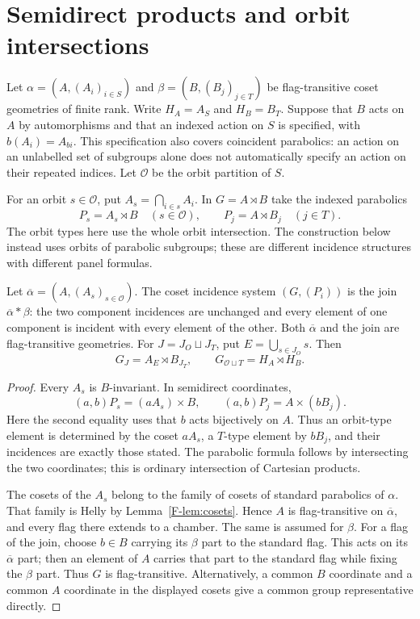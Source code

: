 \section{Semidirect products and orbit intersections}\label{sec:semidirect}

Let $\alpha=(A,(A_i)_{i\in S})$ and
$\beta=(B,(B_j)_{j\in T})$ be flag-transitive coset geometries of
finite rank. Write $H_A=A_S$ and $H_B=B_T$. Suppose that $B$ acts on
$A$ by automorphisms and that an indexed action on $S$ is specified,
with $b(A_i)=A_{bi}$. This specification also covers coincident
parabolics: an action on an unlabelled set of subgroups alone does not
automatically specify an action on their repeated indices. Let
$\mathcal O$ be the orbit partition of $S$.

For an orbit $s\in\mathcal O$, put $A_s=\bigcap_{i\in s}A_i$.
In $G=A\rtimes B$ take the indexed parabolics
\[
 P_s=A_s\rtimes B\quad(s\in\mathcal O),\qquad
 P_j=A\rtimes B_j\quad(j\in T).
\]
The orbit types here use the whole orbit intersection. The construction below instead uses orbits of parabolic subgroups; these are different incidence structures with different panel formulas.

\begin{proposition}\label{J-prop:join}
Let $\overline\alpha=(A,(A_s)_{s\in\mathcal O})$. The coset
incidence system $(G,(P_i))$ is the join
$\overline\alpha*\beta$: the two component incidences are unchanged
and every element of one component is incident with every element of
the other. Both $\overline\alpha$ and the join are flag-transitive
geometries. For $J=J_O\sqcup J_T$, put
$E=\bigcup_{s\in J_O}s$. Then
\[
 G_J=A_E\rtimes B_{J_T},\qquad G_{\mathcal O\sqcup T}=H_A\rtimes H_B.
\]
\end{proposition}
\begin{proof}
Every $A_s$ is $B$-invariant. In semidirect coordinates,
\[
 (a,b)P_s=(aA_s)\times B,\qquad
 (a,b)P_j=A\times(bB_j).
\]
Here the second equality uses that $b$ acts bijectively on $A$.
Thus an orbit-type element is determined by the coset $aA_s$, a
$T$-type element by $bB_j$, and their incidences are exactly those
stated. The parabolic formula follows by intersecting the two
coordinates; this is ordinary intersection of Cartesian products.

The cosets of the $A_s$ belong to the family of cosets of standard
parabolics of $\alpha$. That family is Helly by Lemma~\ref{F-lem:cosets}. Hence $A$ is flag-transitive on $\overline\alpha$, and every
flag there extends to a chamber. The same is assumed for $\beta$.
For a flag of the join, choose $b\in B$ carrying its $\beta$ part
to the standard flag. This acts on its $\overline\alpha$ part;
then an element of $A$ carries that part to the standard flag while
fixing the $\beta$ part. Thus $G$ is flag-transitive. Alternatively,
a common $B$ coordinate and a common $A$ coordinate in the displayed
cosets give a common group representative directly.
\end{proof}

